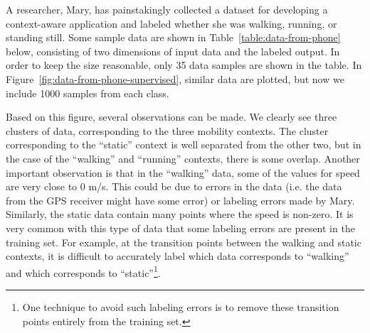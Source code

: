 A researcher, Mary, has painstakingly collected a dataset for developing a context-aware application and labeled whether she was walking, running, or standing still. Some sample data are shown in Table~\ref{table:data-from-phone} below, consisting of two dimensions of input data and the labeled output. In order to keep the size reasonable, only 35 data samples are shown in the table. In Figure~\ref{fig:data-from-phone-supervised}, similar data are plotted, but now we include 1000 samples from each class.

Based on this figure, several observations can be made. We clearly see three clusters of data, corresponding to the three mobility contexts. The cluster corresponding to the ``static'' context is well separated from the other two, but in the case of the ``walking'' and ``running'' contexts, there is some overlap. Another important observation is that in the ``walking'' data, some of the values for speed are very close to 0 m/s. This could be due to errors in the data (i.e. the data from the GPS receiver might have some error) or labeling errors made by Mary. Similarly, the static data contain many points where the speed is non-zero. It is very common with this type of data that some labeling errors are present in the training set. For example, at the transition points between the walking and static contexts, it is difficult to accurately label which data corresponds to ``walking'' and which corresponds to ``static''\footnote{One technique to avoid such labeling errors is to remove these transition points entirely from the training set.}.

